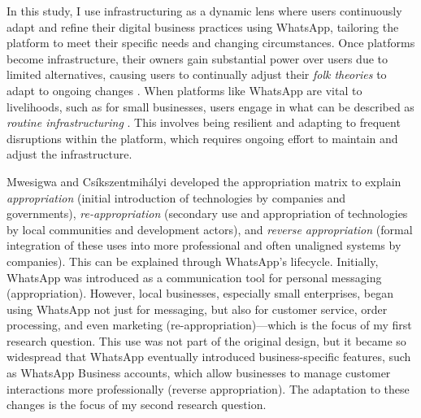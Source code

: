 In this study, I use infrastructuring as a dynamic lens where users continuously adapt \cite{karasti2018studying} and refine their digital business practices using WhatsApp, tailoring the platform to meet their specific needs and changing circumstances. Once platforms become infrastructure, their owners gain substantial power over users due to limited alternatives, causing users to continually adjust their \textit{folk theories} to adapt to ongoing changes \cite{10.1145/3476080, 10.1145/3392847, 10.1145/3533700, 10.1145/3359146}. When platforms like WhatsApp are vital to livelihoods, such as for small businesses, users engage in what can be described as \textit{routine infrastructuring} \cite{10.1145/3359175}. This involves being resilient and adapting to frequent disruptions within the platform, which requires ongoing effort to maintain and adjust the infrastructure.



Mwesigwa and Csíkszentmihályi \cite{10.1145/3613904.3642590} developed the appropriation matrix to explain \textit{appropriation} (initial introduction of technologies by companies and governments), \textit{re-appropriation} (secondary use and appropriation of technologies by local communities and development actors), and \textit{reverse appropriation} (formal integration of these uses into more professional and often unaligned systems by companies). This can be explained through WhatsApp's lifecycle. Initially, WhatsApp was introduced as a communication tool for personal messaging (appropriation). However, local businesses, especially small enterprises, began using WhatsApp not just for messaging, but also for customer service, order processing, and even marketing (re-appropriation)—which is the focus of my first research question. This use was not part of the original design, but it became so widespread that WhatsApp eventually introduced business-specific features, such as WhatsApp Business accounts, which allow businesses to manage customer interactions more professionally (reverse appropriation). The adaptation to these changes is the focus of my second research question. 

